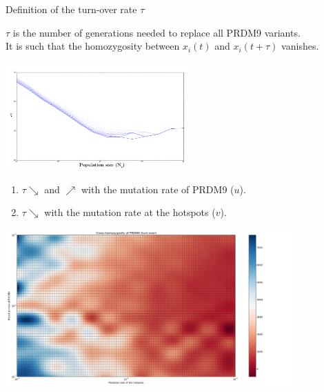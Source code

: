 \documentclass[10pt]{beamer}
\begin{document}
\begin{frame}
	\begin{center}
		\Large
    	Definition of the turn-over rate $\tau$ 
    \end{center}
	$\tau$ is the number of generations needed to replace all PRDM9 variants. \\
	It is such that the homozygosity between $x_i(t)$ and $x_i(t+\tau)$ vanishes.
	\begin{center}
       \includegraphics[width=7cm]{Images/ne-turn-over.png}
	\end{center}
\end{frame}

\begin{frame}
	\begin{center}
		\begin{enumerate}
		\item $\tau \searrow$ and $\nearrow$ with the mutation rate of PRDM9 ($u$).
		
		\item $\tau \searrow$ with the mutation rate at the hotspots ($v$).
		\end{enumerate}
       \includegraphics[width=11cm]{Images/cross-homozygosity-mutation-erosion.png}
	\end{center}
\end{frame}
\end{document}
